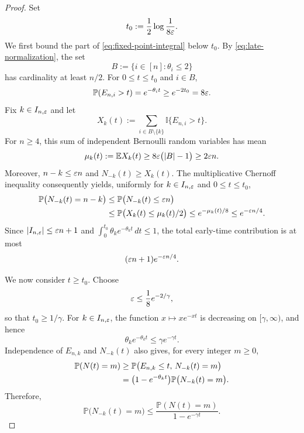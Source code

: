 \documentclass[10pt]{article}
\numberwithin{equation}{section}
\begin{document}
\begin{proof}
    Set
    \begin{equation}\label{eq:t-zero}
        t_0:=\frac12\log\frac{1}{8\varepsilon}.
    \end{equation}
    We first bound the part of \eqref{eq:fixed-point-integral} below $t_0$.
    By \eqref{eq:late-normalization}, the set
    \[
        B:=\{i\in[n]:\theta_i\leq2\}
    \]
    has cardinality at least $n/2$.  For $0\leq t\leq t_0$ and $i\in B$,
    \[
        \mathbb P(E_{n,i}>t)=e^{-\theta_i t}
        \geq e^{-2t_0}=8\varepsilon.
    \]
    Fix $k\in I_{n,\varepsilon}$ and let
    \[
        X_k(t):=\sum_{i\in B\setminus\{k\}}
                   \mathbb I\{E_{n,i}>t\}.
    \]
    For $n\geq4$, this sum of independent Bernoulli random variables has mean
    \begin{equation}\label{eq:X-mean-lower-bound}
        \mu_k(t):=\mathbb E X_k(t)
        \geq 8\varepsilon\bigl(|B|-1\bigr)
        \geq2\varepsilon n.
    \end{equation}
    Moreover, $n-k\leq\varepsilon n$ and $N_{-k}(t)\geq X_k(t)$.  The multiplicative
    Chernoff inequality consequently yields, uniformly for
    $k\in I_{n,\varepsilon}$ and $0\leq t\leq t_0$,
    \begin{align}
        \mathbb P\bigl(N_{-k}(t)=n-k\bigr)
        &\leq \mathbb P\bigl(N_{-k}(t)\leq\varepsilon n\bigr)\notag\\
        &\leq \mathbb P\bigl(X_k(t)\leq\mu_k(t)/2\bigr)
        \leq e^{-\mu_k(t)/8}
        \leq e^{-\varepsilon n/4}.
        \label{eq:early-time-bound}
    \end{align}
    Since $|I_{n,\varepsilon}|\leq\varepsilon n+1$ and
    $\int_0^{t_0}\theta_k e^{-\theta_k t}\,dt\leq1$, the total early-time
    contribution is at most
    \begin{equation}\label{eq:early-time-sum}
        (\varepsilon n+1)e^{-\varepsilon n/4}.
    \end{equation}

    We now consider $t\geq t_0$.  Choose
    \begin{equation}\label{eq:epsilon-first-restriction}
        \varepsilon\leq\frac18e^{-2/\gamma},
    \end{equation}
    so that $t_0\geq1/\gamma$.  For $k\in I_{n,\varepsilon}$, the function
    $x\mapsto xe^{-xt}$ is decreasing on $[\gamma,\infty)$, and hence
    \begin{equation}\label{eq:rate-density-bound}
        \theta_k e^{-\theta_k t}\leq\gamma e^{-\gamma t}.
    \end{equation}
    Independence of $E_{n,k}$ and $N_{-k}(t)$ also gives, for every integer
    $m\geq0$,
    \begin{align}
        \mathbb P(N(t)=m)
        &\geq \mathbb P\bigl(E_{n,k}\leq t,\,N_{-k}(t)=m\bigr)\notag\\
        &=\bigl(1-e^{-\theta_k t}\bigr)
          \mathbb P\bigl(N_{-k}(t)=m\bigr).
    \end{align}
    Therefore,
    \begin{equation}\label{eq:delete-one-survivor-bound}
        \mathbb P\bigl(N_{-k}(t)=m\bigr)
        \leq\frac{\mathbb P(N(t)=m)}{1-e^{-\gamma t}}.
    \end{equation}


\end{proof}
\end{document}
